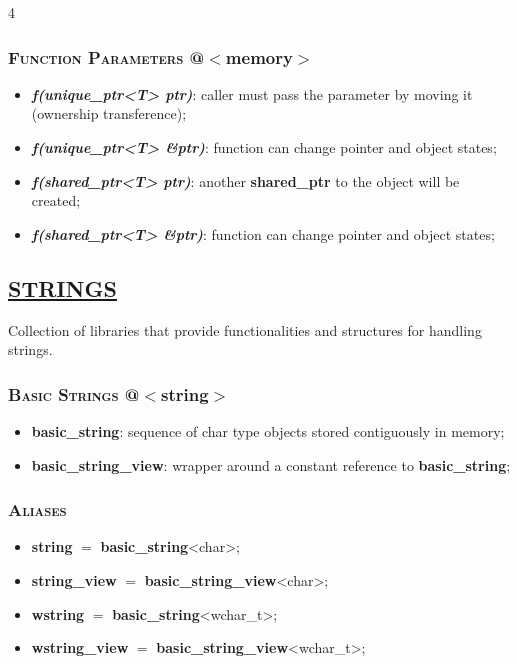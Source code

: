 \documentclass[10pt]{article}
\newcommand{\softseparator}{%
  \par\noindent{\color{RuleGray}\rule{\linewidth}{0.35pt}}\vspace{1pt}
}
\begin{document}
\begin{multicols*}{4}
{\subsubsection*{\textsc{Function Parameters} @$<$memory$>$} 
\begin{itemize}[leftmargin=*,topsep=0.25pt]
  \setlength\itemsep{-1.8pt}
	\item  \emph{\textbf{f(unique\_ptr<T> ptr)}}: caller must pass the parameter by moving it (ownership transference);
	\item  \emph{\textbf{f(unique\_ptr<T> \&ptr)}}: function can change pointer and object states;
	\item  \emph{\textbf{f(shared\_ptr<T> ptr)}}: another \textbf{shared\_ptr} to the object will be created;
	\item  \emph{\textbf{f(shared\_ptr<T> \&ptr)}}: function can change pointer and object states;
\end{itemize}

}

\softseparator

{\color{Blue}
\subsection*{\href{https://en.cppreference.com/w/cpp/string}{\underline{STRINGS}}}	
\noindent
Collection of libraries that provide functionalities and structures for handling strings.

\subsubsection*{\textsc{Basic Strings}  @$<$string$>$} 
\begin{itemize}[leftmargin=*,topsep=0.25pt]
  \setlength\itemsep{-1.8pt}
	\item  {\textbf{basic\_string}}: sequence of char type objects stored contiguously in memory;
	\item  {\textbf{basic\_string\_view}}: wrapper around a constant reference to \textbf{basic\_string};
\end{itemize}

\subsubsection*{\textsc{Aliases}} 
\begin{itemize}[leftmargin=*,topsep=0.25pt]
  \setlength\itemsep{-1.8pt}
	\item \textbf{string} $=$ \textbf{basic\_string}<char>;
	\item \textbf{string\_view} $=$ \textbf{basic\_string\_view}<char>;
	\item \textbf{wstring} $=$ \textbf{basic\_string}<wchar\_t>;
	\item \textbf{wstring\_view} $=$ \textbf{basic\_string\_view}<wchar\_t>;
\end{itemize}

}
\end{multicols*}
\end{document}

